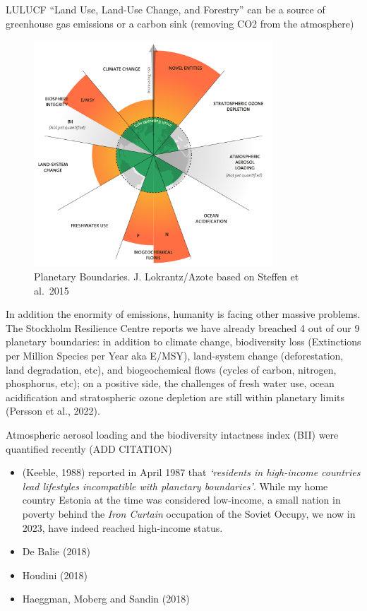 \documentclass[
  letterpaper,
  DIV=11,
  numbers=noendperiod]{scrartcl}
\providecommand{\tightlist}{%
  \setlength{\itemsep}{0pt}\setlength{\parskip}{0pt}}\usepackage{longtable,booktabs,array}
\begin{document}
LULUCF ``Land Use, Land-Use Change, and Forestry'' can be a source of
greenhouse gas emissions or a carbon sink (removing CO2 from the
atmosphere)

\begin{figure}[H]

{\centering \includegraphics[width=0.8\textwidth,height=\textheight]{./images/boundaries.png}

}

\caption{Planetary Boundaries. J. Lokrantz/Azote based on Steffen et
al.~2015}

\end{figure}%

In addition the enormity of emissions, humanity is facing other massive
problems. The Stockholm Resilience Centre reports we have already
breached 4 out of our 9 planetary boundaries: in addition to climate
change, biodiversity loss (Extinctions per Million Species per Year aka
E/MSY), land-system change (deforestation, land degradation, etc), and
biogeochemical flows (cycles of carbon, nitrogen, phosphorus, etc); on a
positive side, the challenges of fresh water use, ocean acidification
and stratospheric ozone depletion are still within planetary limits
(Persson et al., 2022).

Atmospheric aerosol loading and the biodiversity intactness index (BII)
were quantified recently (ADD CITATION)

\begin{itemize}
\tightlist
\item
  (Keeble, 1988) reported in April 1987 that \emph{`residents in
  high-income countries lead lifestyles incompatible with planetary
  boundaries'}. While my home country Estonia at the time was considered
  low-income, a small nation in poverty behind the \emph{Iron Curtain}
  occupation of the Soviet Occupy, we now in 2023, have indeed reached
  high-income status.
\item
  De Balie (2018)
\item
  Houdini (2018)
\item
  Haeggman, Moberg and Sandin (2018)
\end{itemize}
\end{document}
